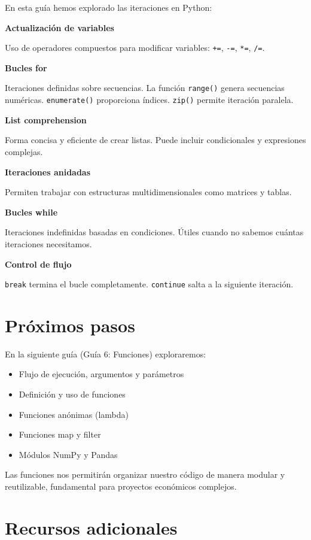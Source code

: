 \documentclass[
  doc,
  floatsintext,
  longtable,
  a4paper,
  nolmodern,
  notxfonts,
  notimes,
  12pt,
  colorlinks=true,linkcolor=blue,citecolor=blue,urlcolor=blue]{apa7}
\providecommand{\tightlist}{%
  \setlength{\itemsep}{0pt}\setlength{\parskip}{0pt}}
\begin{document}
En esta guía hemos explorado las iteraciones en Python:

\textbf{Actualización de variables}

Uso de operadores compuestos para modificar variables: \texttt{+=},
\texttt{-=}, \texttt{*=}, \texttt{/=}.

\textbf{Bucles for}

Iteraciones definidas sobre secuencias. La función \texttt{range()}
genera secuencias numéricas. \texttt{enumerate()} proporciona índices.
\texttt{zip()} permite iteración paralela.

\textbf{List comprehension}

Forma concisa y eficiente de crear listas. Puede incluir condicionales y
expresiones complejas.

\textbf{Iteraciones anidadas}

Permiten trabajar con estructuras multidimensionales como matrices y
tablas.

\textbf{Bucles while}

Iteraciones indefinidas basadas en condiciones. Útiles cuando no sabemos
cuántas iteraciones necesitamos.

\textbf{Control de flujo}

\texttt{break} termina el bucle completamente. \texttt{continue} salta a
la siguiente iteración.

\section{Próximos pasos}\label{pruxf3ximos-pasos}

En la siguiente guía (Guía 6: Funciones) exploraremos:

\begin{itemize}
\tightlist
\item
  Flujo de ejecución, argumentos y parámetros
\item
  Definición y uso de funciones
\item
  Funciones anónimas (lambda)
\item
  Funciones map y filter
\item
  Módulos NumPy y Pandas
\end{itemize}

Las funciones nos permitirán organizar nuestro código de manera modular
y reutilizable, fundamental para proyectos económicos complejos.

\section{Recursos adicionales}\label{recursos-adicionales}
\end{document}
